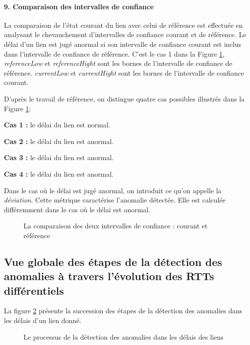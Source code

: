  \paragraph{9. Comparaison des intervalles de confiance} 

La comparaison de l'état courant du lien avec celui de référence est effectuée en analysant le chevauchement d'intervalles de confiance  courant et de référence. Le délai d'un lien est jugé anormal si son intervalle de confiance courant est inclus dans l'intervalle de confiance de référence. C'est le cas 1 dans la Figure 	\ref{fig:intervals-comparaison},  \textit{referenceLow} et \textit{referenceHight} sont les bornes de l'intervalle de confiance de référence.  \textit{currentLow} et \textit{currentHight} sont les bornes de l'intervalle de confiance courant.

D'après le travail de référence, on distingue quatre cas possibles  illustrés dans la Figure 	\ref{fig:intervals-comparaison}:

\textbf{Cas 1 :} le délai du lien est normal.

\textbf{Cas 2 :} le délai du lien est anormal.

\textbf{Cas 3 :} le délai du lien est anormal.

\textbf{Cas 4 :} le délai du lien est anormal.

Dans le cas où le délai est jugé anormal, on introduit ce qu'on appelle la \textit{déviation}. Cette métrique caractérise l'anomalie détectée. Elle est calculée différemment dans le cas où le délai est anormal.

\begin{figure}[h]
	\centering
	\captionsetup{justification=centering}
	\resizebox{\textwidth}{!}{
		
	}
	\caption{La comparaison des deux intervalles de confiance : courant et référence }
	\label{fig:intervals-comparaison}
\end{figure}

\subsection{Vue globale des étapes de la détection des anomalies à travers l'évolution des RTTs différentiels}
La figure 	\ref{fig:process-rttanalysis_tex} présente la succession des étapes de la détection des anomalies dans les délais d'un lien donné. 

\begin{figure}[h]
	\centering
	\resizebox{\textwidth}{\textheight}{
		
	}
	\caption{Le processus de la détection des anomalies dans les délais des liens}
	\label{fig:process-rttanalysis_tex}
\end{figure}



